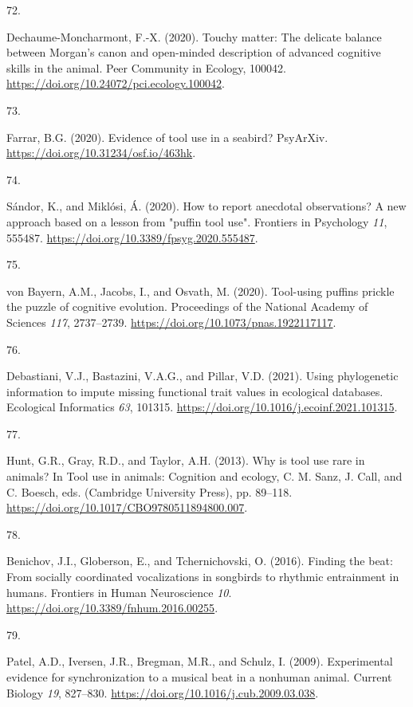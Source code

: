 \documentclass[
  man, donotrepeattitle,floatsintext]{apa6}
\newlength{\cslhangindent}
\newlength{\csllabelwidth}
\newlength{\cslentryspacingunit} %
\newenvironment{CSLReferences}[2] %
 {%
  \setlength{\parindent}{0pt}
  \ifodd #1
  \let\oldpar\par
  \def\par{\hangindent=\cslhangindent\oldpar}
  \fi
  \setlength{\parskip}{#2\cslentryspacingunit}
 }%
 {}
\newcommand{\CSLLeftMargin}[1]{\parbox[t]{\csllabelwidth}{#1}}
\newcommand{\CSLRightInline}[1]{\parbox[t]{\linewidth - \csllabelwidth}{#1}\break}
\begin{document}
\begin{CSLReferences}{0}{0}
\leavevmode{}%
\CSLLeftMargin{72. }%
\CSLRightInline{Dechaume-Moncharmont, F.-X. (2020). Touchy matter: The delicate balance between {M}organ's canon and open-minded description of advanced cognitive skills in the animal. Peer Community in Ecology, 100042. \url{https://doi.org/10.24072/pci.ecology.100042}.}

\leavevmode{}%
\CSLLeftMargin{73. }%
\CSLRightInline{Farrar, B.G. (2020). Evidence of tool use in a seabird? PsyArXiv. \url{https://doi.org/10.31234/osf.io/463hk}.}

\leavevmode{}%
\CSLLeftMargin{74. }%
\CSLRightInline{Sándor, K., and Miklósi, Á. (2020). How to report anecdotal observations? A new approach based on a lesson from "puffin tool use". Frontiers in Psychology \emph{11}, 555487. \url{https://doi.org/10.3389/fpsyg.2020.555487}.}

\leavevmode{}%
\CSLLeftMargin{75. }%
\CSLRightInline{von Bayern, A.M., Jacobs, I., and Osvath, M. (2020). Tool-using puffins prickle the puzzle of cognitive evolution. Proceedings of the National Academy of Sciences \emph{117}, 2737--2739. \url{https://doi.org/10.1073/pnas.1922117117}.}

\leavevmode{}%
\CSLLeftMargin{76. }%
\CSLRightInline{Debastiani, V.J., Bastazini, V.A.G., and Pillar, V.D. (2021). Using phylogenetic information to impute missing functional trait values in ecological databases. Ecological Informatics \emph{63}, 101315. \url{https://doi.org/10.1016/j.ecoinf.2021.101315}.}

\leavevmode{}%
\CSLLeftMargin{77. }%
\CSLRightInline{Hunt, G.R., Gray, R.D., and Taylor, A.H. (2013). Why is tool use rare in animals? In Tool use in animals: Cognition and ecology, C. M. Sanz, J. Call, and C. Boesch, eds. (Cambridge University Press), pp. 89--118. \url{https://doi.org/10.1017/CBO9780511894800.007}.}

\leavevmode{}%
\CSLLeftMargin{78. }%
\CSLRightInline{Benichov, J.I., Globerson, E., and Tchernichovski, O. (2016). Finding the beat: From socially coordinated vocalizations in songbirds to rhythmic entrainment in humans. Frontiers in Human Neuroscience \emph{10}. \url{https://doi.org/10.3389/fnhum.2016.00255}.}

\leavevmode{}%
\CSLLeftMargin{79. }%
\CSLRightInline{Patel, A.D., Iversen, J.R., Bregman, M.R., and Schulz, I. (2009). Experimental evidence for synchronization to a musical beat in a nonhuman animal. Current Biology \emph{19}, 827--830. \url{https://doi.org/10.1016/j.cub.2009.03.038}.}


\end{CSLReferences}
\end{document}
